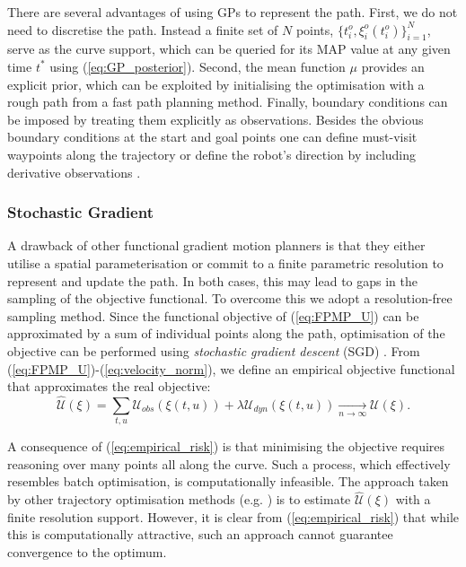 \documentclass[letterpaper, 10 pt, conference]{ieeeconf}  %
\begin{document}
There are several advantages of using GPs to represent the path. First, we do not need to discretise the path. Instead a finite set of $N$ points, $\{t_i^o, \xi_i^o(t_i^o)\}_{i=1}^N$, serve as the curve support, which can be queried for its MAP value at any given time $t^*$ using (\ref{eq:GP_posterior}). Second, the mean function $\mu$ provides an explicit prior, which can be exploited by initialising the optimisation with a rough path from a fast path planning method. Finally, boundary conditions can be imposed by treating them explicitly as observations. Besides the obvious boundary conditions at the start and goal points one can define must-visit waypoints along the trajectory or define the robot's direction by including derivative observations \cite{Solak2002}.

\subsubsection{Stochastic Gradient}

A drawback of other functional gradient motion planners is that they either utilise a spatial parameterisation or commit to a finite parametric resolution to represent and update the path. In both cases, this may lead to gaps in the sampling of the objective functional. To overcome this we adopt a resolution-free sampling method. Since the functional objective of (\ref{eq:FPMP_U}) can be approximated by a sum of individual points along the path, optimisation of the objective can be performed using \textit{stochastic gradient descent} (SGD) \cite{Bottou2010}. From (\ref{eq:FPMP_U})-(\ref{eq:velocity_norm}), we define an empirical objective functional that approximates the real objective:
\begin{equation}\label{eq:empirical_risk}
	\hat{\mathcal{U}}(\xi) = \sum_{t,u} \mathcal{U}_{obs}\left(\xi(t,u)\right) + \lambda\mathcal{U}_{dyn}\left(\xi(t,u)\right) \xrightarrow[n \rightarrow \infty]{} \mathcal{U}(\xi).
\end{equation}

A consequence of (\ref{eq:empirical_risk}) is that minimising the objective requires reasoning over many points all along the curve. Such a process, which effectively resembles batch optimisation, is computationally infeasible. The approach taken by other trajectory optimisation methods (e.g. \cite{Marinho2016,mukadam2016gaussian}) is to estimate $\hat{\mathcal{U}}(\xi)$ with a finite resolution support. However, it is clear from (\ref{eq:empirical_risk}) that while this is computationally attractive, such an approach cannot guarantee convergence to the optimum.
\end{document}
